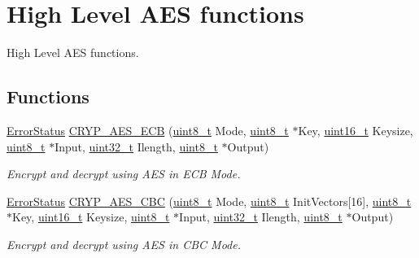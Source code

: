 \hypertarget{group___c_r_y_p___group6}{\section{High Level A\-E\-S functions}
\label{group___c_r_y_p___group6}
}


High Level A\-E\-S functions.  


\subsection*{Functions}
\begin{DoxyCompactItemize}
\item 
\hyperlink{group___exported__types_ga8333b96c67f83cba354b3407fcbb6ee8}{Error\-Status} \hyperlink{group___c_r_y_p___group6_ga79ff82ece0e9620dc86d6e57abe639e1}{C\-R\-Y\-P\-\_\-\-A\-E\-S\-\_\-\-E\-C\-B} (\hyperlink{stdint_8h_aba7bc1797add20fe3efdf37ced1182c5}{uint8\-\_\-t} Mode, \hyperlink{stdint_8h_aba7bc1797add20fe3efdf37ced1182c5}{uint8\-\_\-t} $\ast$Key, \hyperlink{stdint_8h_a273cf69d639a59973b6019625df33e30}{uint16\-\_\-t} Keysize, \hyperlink{stdint_8h_aba7bc1797add20fe3efdf37ced1182c5}{uint8\-\_\-t} $\ast$Input, \hyperlink{stdint_8h_a435d1572bf3f880d55459d9805097f62}{uint32\-\_\-t} Ilength, \hyperlink{stdint_8h_aba7bc1797add20fe3efdf37ced1182c5}{uint8\-\_\-t} $\ast$Output)
\begin{DoxyCompactList}\small\item\em Encrypt and decrypt using A\-E\-S in E\-C\-B Mode. \end{DoxyCompactList}\item 
\hyperlink{group___exported__types_ga8333b96c67f83cba354b3407fcbb6ee8}{Error\-Status} \hyperlink{group___c_r_y_p___group6_gaa43eadf707257710f6a53b3295b39d70}{C\-R\-Y\-P\-\_\-\-A\-E\-S\-\_\-\-C\-B\-C} (\hyperlink{stdint_8h_aba7bc1797add20fe3efdf37ced1182c5}{uint8\-\_\-t} Mode, \hyperlink{stdint_8h_aba7bc1797add20fe3efdf37ced1182c5}{uint8\-\_\-t} Init\-Vectors\mbox{[}16\mbox{]}, \hyperlink{stdint_8h_aba7bc1797add20fe3efdf37ced1182c5}{uint8\-\_\-t} $\ast$Key, \hyperlink{stdint_8h_a273cf69d639a59973b6019625df33e30}{uint16\-\_\-t} Keysize, \hyperlink{stdint_8h_aba7bc1797add20fe3efdf37ced1182c5}{uint8\-\_\-t} $\ast$Input, \hyperlink{stdint_8h_a435d1572bf3f880d55459d9805097f62}{uint32\-\_\-t} Ilength, \hyperlink{stdint_8h_aba7bc1797add20fe3efdf37ced1182c5}{uint8\-\_\-t} $\ast$Output)
\begin{DoxyCompactList}\small\item\em Encrypt and decrypt using A\-E\-S in C\-B\-C Mode. \end{DoxyCompactList}\item 

\end{DoxyCompactItemize}

